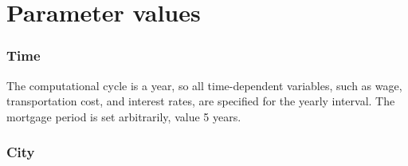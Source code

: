 \section{Parameter values}\label{sec-param-values}

\subsubsection{Time}
 The computational cycle is a year, so all time-dependent variables, such as wage, transportation cost, and interest rates, are specified for the yearly interval. The mortgage period is set arbitrarily, value 5 years. 

 
\subsubsection{City}
